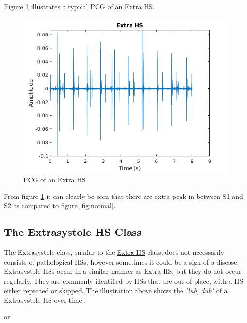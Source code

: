 \documentclass[10pt,twocolumn]{witseiepaper}
\begin{document}
Figure \ref{fig:extra} illustrates a typical PCG of an Extra HS.
\begin{figure}[h!]
    \centering
    \includegraphics[scale = 0.45]{./extra.png}
    \caption{PCG of an Extra HS}
    \label{fig:extra}
\end{figure}{}

From figure \ref{fig:extra} it can clearly be seen that there are extra peak in between S1 and S2 as compared to figure \ref{fig:normal}.

\subsection*{The Extrasystole HS Class}
The Extrasystole class, similar to the \hyperref[sec:extra]{Extra HS} class, does not necessarily consists of pathological HSs, however sometimes it could be a sign of a disease. Extrasystole HSs occur in a similar manner as Extra HS, but they do not occur regularly. They are commonly identified by HSs that are out of place, with a HS either repeated or skipped. The illustration above shows the \textit{"lub, dub"} of a Extrasystole HS over time \cite{bentley}.


\hspace{3.5cm} or 

\end{document}
